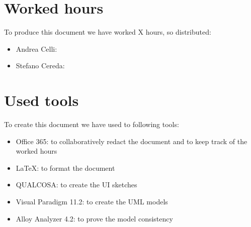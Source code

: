 \documentclass[10pt,a4paper,titlepage]{article}
\begin{document}
\section{Worked hours}
To produce this document we have worked X hours, so distributed:
\begin{itemize}
\item Andrea Celli:
\item Stefano Cereda:
\end{itemize}

\section{Used tools}
To create this document we have used to following tools:
\begin{itemize}
\item Office 365: to collaboratively redact the document and to keep track of the worked hours
\item LaTeX: to format the document
\item QUALCOSA: to create the UI sketches
\item Visual Paradigm 11.2: to create the UML models
\item Alloy Analyzer 4.2: to prove the model consistency
\end{itemize}

\clearpage
\tableofcontents
\end{document}
